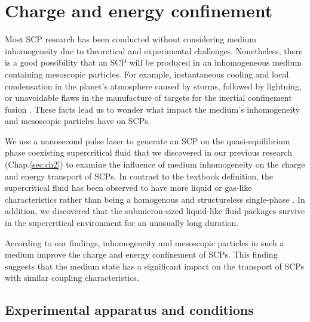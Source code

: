 
\chapter{Charge and energy confinement}
\label{sec:ch4}

Most SCP research has been conducted without considering medium inhomogeneity due to theoretical and experimental challenges. Nonetheless, there is a good possibility that an SCP will be produced in an inhomogeneous medium containing mesoscopic particles. For example, instantaneous cooling and local condensation in the planet's atmosphere caused by storms, followed by lightning, or unavoidable flaws in the manufacture of targets for the inertial confinement fusion \cite{clark2010plastic, wang2017development}. These facts lead us to wonder what impact the medium's inhomogeneity and mesoscopic particles have on SCPs.

We use a nanosecond pulse laser to generate an SCP on the quasi-equilibrium phase coexisting supercritical fluid that we discovered in our previous research (Chap.\ref{sec:ch2}) to examine the influence of medium inhomogeneity on the charge and energy transport of SCPs. In contrast to the textbook definition, the supercritical fluid has been observed to have more liquid or gas-like characteristics rather than being a homogenous and structureless single-phase \cite{simeoni2010widom, gorelli2006liquidlike, banuti2015crossing, maxim2019visualization, pipich2018densification, pipich2020polymorphic, prescher2017experimental, proctor2018liquid, bryk2017behavior, ploetz2019gas, schienbein2018investigation}. In addition, we discovered that the submicron-sized liquid-like fluid packages survive in the supercritical environment for an unusually long duration.

According to our findings, inhomogeneity and mesoscopic particles in such a medium improve the charge and energy confinement of SCPs. This finding suggests that the medium state has a significant impact on the transport of SCPs with similar coupling characteristics.



\section{Experimental apparatus and conditions}
\label{sec:ch4-1}

